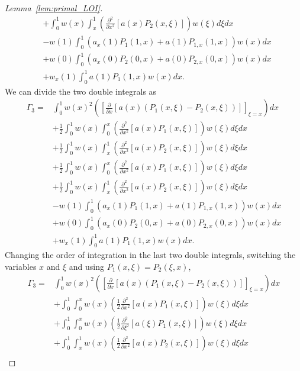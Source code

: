 \documentclass[US letter, 9 pt, conference]{ieeeconf}  \usepackage{setspace}
\newcommand{\pfx}{\frac{\partial}{\partial x}}
\newcommand{\igzo}{\int_0^1}
\newcommand{\igzx}{\int_0^x}
\newcommand{\igxo}{\int_x^1}
\newcommand{\hlf}{\frac{1}{2}}
\begin{document}
\begin{proof}[Lemma~\ref{lem:primal_LOI}]
\begin{align}
 &  +  \igzo w(x)\igxo  \left( \frac{\partial^2}{\partial x^2}\left[a(x)P_2(x,\xi) \right] \right) w(\xi) d\xi  dx \nonumber \\
 &   - w(1) \igzo \left(a_x(1)P_1(1,x)+a(1)P_{1,x}(1,x) \right) w(x) dx \nonumber \\
 & + w(0) \igzo \left(a_x(0)P_2(0,x)+a(0)P_{2,x}(0,x) \right)w(x)dx \nonumber \\
 &   + w_x(1) \igzo a(1)P_1(1,x) w(x)dx. \nonumber
 \end{align} We can divide the two double integrals as
\begin{align}
 \Gamma_3 \nonumber  = & \igzo w(x)^2\left( \left[ \pfx \left[a(x)(P_1(x,\xi)-P_2(x,\xi)) \right] \right]_{\xi=x} \right) dx \nonumber \\
 & + \hlf \igzo w(x)\igzx  \left( \frac{\partial^2}{\partial x^2}\left[a(x)P_1(x,\xi) \right] \right) w(\xi) d\xi dx \nonumber \\
 &  + \hlf \igzo w(x)\igxo  \left( \frac{\partial^2}{\partial x^2}\left[a(x)P_2(x,\xi) \right] \right) w(\xi) d\xi  dx \nonumber \\
&  + \hlf \igzo w(x)\igzx  \left( \frac{\partial^2}{\partial x^2}\left[a(x)P_1(x,\xi) \right] \right) w(\xi) d\xi dx \nonumber \\
 &  + \hlf \igzo w(x)\igxo  \left( \frac{\partial^2}{\partial x^2}\left[a(x)P_2(x,\xi) \right] \right) w(\xi) d\xi  dx \nonumber \\
 &   - w(1) \igzo \left(a_x(1)P_1(1,x)+a(1)P_{1,x}(1,x) \right) w(x) dx \nonumber \\
& + w(0) \igzo \left(a_x(0)P_2(0,x)+a(0)P_{2,x}(0,x) \right)w(x)dx \nonumber \\ 
 &   + w_x(1) \igzo a(1)P_1(1,x) w(x)dx. \nonumber
 \end{align}
  Changing the order of integration in the last two double integrals, switching the variables $x$ and $\xi$ and using $P_1(x,\xi)=P_2(\xi,x)$,
 \begin{align}
 \Gamma_3 = & \igzo w(x)^2\left( \left[ \pfx \left[a(x)(P_1(x,\xi)-P_2(x,\xi)) \right] \right]_{\xi=x} \right) dx \nonumber \\
 &  +  \igzo \igzx w(x) \left(\hlf \frac{\partial^2}{\partial x^2}\left[a(x)P_1(x,\xi) \right]\right)w(\xi)d\xi dx \nonumber \\
 &  +\igzo \igzx w(x)\left(\hlf \frac{\partial^2}{\partial \xi^2}\left[a(\xi)P_1(x,\xi) \right] \right) w(\xi) d\xi dx \nonumber \\
 & + \igzo \igxo w(x) \left(\hlf \frac{\partial^2}{\partial x^2}\left[a(x)P_2(x,\xi) \right]\right)w(\xi)d\xi dx \nonumber \\

\end{align}
\end{proof}
\end{document}
